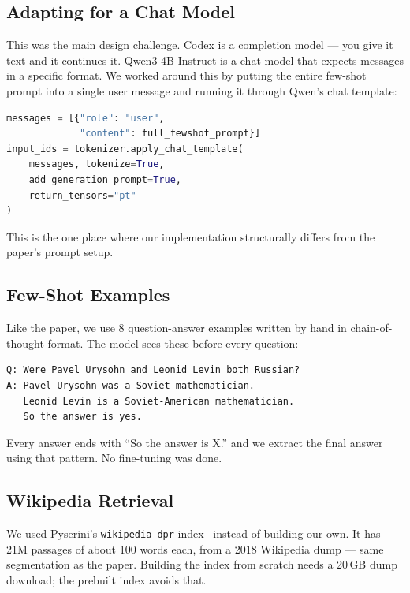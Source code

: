 \documentclass[conference]{IEEEtran}
\begin{document}
\subsection{Adapting for a Chat Model}

This was the main design challenge. Codex is a completion model — you
give it text and it continues it. Qwen3-4B-Instruct is a chat model
that expects messages in a specific format. We worked around this by
putting the entire few-shot prompt into a single user message and
running it through Qwen's chat template:

\begin{lstlisting}[language=Python, caption={Wrapping the few-shot prompt as a chat message}]
messages = [{"role": "user",
             "content": full_fewshot_prompt}]
input_ids = tokenizer.apply_chat_template(
    messages, tokenize=True,
    add_generation_prompt=True,
    return_tensors="pt"
)
\end{lstlisting}

This is the one place where our implementation structurally differs
from the paper's prompt setup.

\subsection{Few-Shot Examples}

Like the paper, we use 8 question-answer examples written by hand in
chain-of-thought format. The model sees these before every question:

\begin{lstlisting}[caption={Example from src/templates.py}]
Q: Were Pavel Urysohn and Leonid Levin both Russian?
A: Pavel Urysohn was a Soviet mathematician.
   Leonid Levin is a Soviet-American mathematician.
   So the answer is yes.
\end{lstlisting}

Every answer ends with ``So the answer is X.'' and we extract the
final answer using that pattern. No fine-tuning was done.

\subsection{Wikipedia Retrieval}

We used Pyserini's \texttt{wikipedia-dpr} index~\cite{pyserini}
instead of building our own. It has 21M passages of about 100 words
each, from a 2018 Wikipedia dump — same segmentation as the paper.
Building the index from scratch needs a 20\,GB dump download; the
prebuilt index avoids that.
\end{document}
